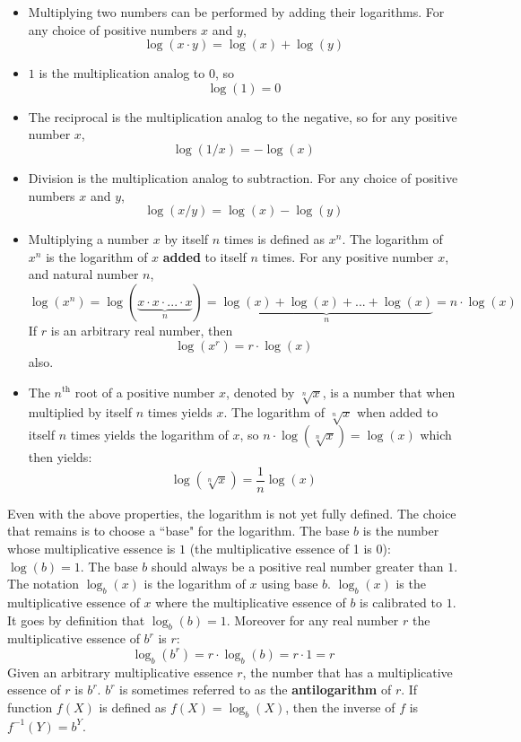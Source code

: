 \documentclass{article}
\begin{document}
\begin{itemize}
\item Multiplying two numbers can be performed by adding their logarithms. For any choice of positive numbers \(x\) and \(y\), 
\[\log(x \cdot y) = \log(x) + \log(y)\]
\item \(1\) is the multiplication analog to \(0\), so
\[\log(1) = 0\]
\item The reciprocal is the multiplication analog to the negative, so for any positive number \(x\), 
\[\log(1/x) = -\log(x)\]
\item Division is the multiplication analog to subtraction. For any choice of positive numbers \(x\) and \(y\), 
\[\log(x / y) = \log(x) - \log(y)\]
\item Multiplying a number \(x\) by itself \(n\) times is defined as \(x^n\). The logarithm of \(x^n\) is the logarithm of \(x\) {\bf added} to itself \(n\) times. For any positive number \(x\), and natural number \(n\),
\[\log(x^n) = \log(\underbrace{x \cdot x \cdot ... \cdot x}_n) = \underbrace{\log(x) + \log(x) + ... + \log(x)}_n = n \cdot \log(x)\]
If \(r\) is an arbitrary real number, then 
\[\log(x^r) = r \cdot \log(x)\]
also.
\item The \(n^\text{th}\) root of a positive number \(x\), denoted by \(\sqrt[n]{x}\), is a number that when multiplied by itself \(n\) times yields \(x\). The logarithm of \(\sqrt[n]{x}\) when added to itself \(n\) times yields the logarithm of \(x\), so \(n \cdot \log(\sqrt[n]{x}) = \log(x)\) which then yields:
\[\log(\sqrt[n]{x}) = \frac{1}{n}\log(x)\]
\end{itemize}

Even with the above properties, the logarithm is not yet fully defined. The choice that remains is to choose a ``base" for the logarithm. The base \(b\) is the number whose multiplicative essence is \(1\) (the multiplicative essence of 1 is 0): \(\log(b) = 1\). The base \(b\) should always be a positive real number greater than \(1\). The notation \(\log_b(x)\) is the logarithm of \(x\) using base \(b\). \(\log_b(x)\) is the multiplicative essence of \(x\) where the multiplicative essence of \(b\) is calibrated to \(1\). It goes by definition that \(\log_b(b) = 1\). Moreover for any real number \(r\) the multiplicative essence of \(b^r\) is \(r\): 
\[\log_b(b^r) = r \cdot \log_b(b) = r \cdot 1 = r\]
Given an arbitrary multiplicative essence \(r\), the number that has a multiplicative essence of \(r\) is \(b^r\). \(b^r\) is sometimes referred to as the {\bf antilogarithm} of \(r\). If function \(f(X)\) is defined as \(f(X) = \log_b(X)\), then the inverse of \(f\) is \(f^{-1}(Y) = b^Y\).
\end{document}

